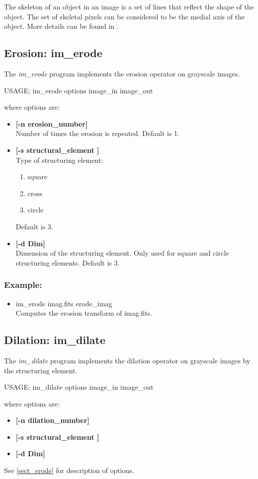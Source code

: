 The skeleton of an object in an image is a set of lines that reflect the
shape of the object. The set of skeletal pixels can be considered to
be the medial axis of the object. More details can be found in \cite{ima:soille99}. 
   
\subsection{Erosion: im\_erode}
\label{sect_erode}
The {\em im\_erode} program implements the erosion operator on grayscale
images.   
{\bf
\begin{center}
USAGE: im\_erode options image\_in image\_out
\end{center}}
where options are:
\begin{itemize}
\item {\bf[-n erosion\_number]} \\
Number of times the erosion is repeated. Default 
is 1.
\item{\bf [-s structural\_element ]} \\
Type of structuring element:
\begin{enumerate}
\baselineskip=0.4truecm
\item square
\item cross
\item circle
\end{enumerate}
Default is 3.
\item{\bf [-d Dim]}  \\
  Dimension of the structuring element. Only used for 
square and circle structuring 
  elements. Default is 3.
\end{itemize}
\subsubsection*{Example:}
\begin{itemize}
\item  im\_erode imag.fits erode\_imag \\
Computes the erosion transform of imag.fits.
\end{itemize}
 
\subsection{Dilation: im\_dilate}
The {\em im\_dilate} program implements the dilation operator on grayscale
images by the structuring element.  
{\bf
\begin{center}
USAGE: im\_dilate options image\_in image\_out
\end{center}}
where options are:
\begin{itemize}
\item {\bf[-n dilation\_number]}  
\item{\bf [-s structural\_element ]} 
\item{\bf [-d Dim]}   
\end{itemize}
See \ref{sect_erode} for description of options.
